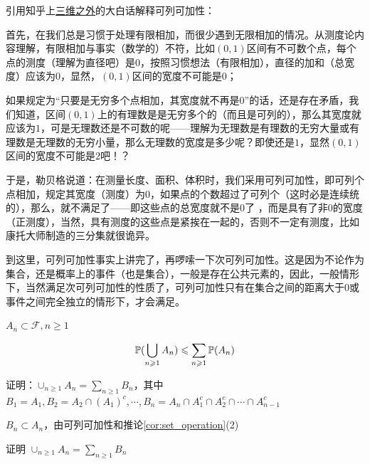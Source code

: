 \begin{remark}
    引用知乎上\href{https://www.zhihu.com/question/25836213/answer/1204497999}{三维之外}的大白话解释可列可加性：

    首先，在我们总是习惯于处理有限相加，而很少遇到无限相加的情况。从测度论内容理解，有限相加与事实（数学的）不符，比如$(0,1)$区间有不可数个点，每个点的测度（理解为直径吧）是$0$，按照习惯想法（有限相加），直径的加和（总宽度）应该为$0$，显然，$(0,1)$区间的宽度不可能是$0$；
    
    如果规定为“只要是无穷多个点相加，其宽度就不再是$0$”的话，还是存在矛盾，我们知道，区间$(0,1)$上的有理数是是无穷多个的（而且是可列的），那么其宽度就应该为$1$，可是无理数还是不可数的呢——理解为无理数是有理数的无穷大量或有理数是无理数的无穷小量，那么无理数的宽度是多少呢？即使还是$1$，显然$(0,1)$区间的宽度不可能是$2$吧！？
    
    于是，勒贝格说道：在测量长度、面积、体积时，我们采用可列可加性，即可列个点相加，规定其宽度（测度）为$0$，如果点的个数超过了可列个（这时必是连续统的），那么，就不满足了——即这些点的总宽度就不是$0$了 ，而是具有了非$0$的宽度（正测度），当然，具有测度的这些点是紧挨在一起的，否则不一定有测度，比如康托大师制造的三分集就很诡异。
    
    到这里，可列可加性事实上讲完了，再啰嗦一下次可列可加性。这是因为不论作为集合，还是概率上的事件（也是集合），一般是存在公共元素的，因此，一般情形下，当然满足次可列可加性的性质了，可列可加性只有在集合之间的距离大于$0$或事件之间完全独立的情形下，才会满足。
\end{remark}

\begin{property}[次可列可加性]
    $A_n\subset \mathcal{F}, n\geq 1$

    \[
    \mathbb{P}(\bigcup_{n\geqslant 1}A_n)\leqslant \sum_{n\geqslant 1}\mathbb{P}(A_n)
    \]
\end{property}

证明：$\cup_{n\geq 1}A_n=\sum_{n\geq 1}B_n$，其中 $B_1=A_1, B_2=A_2\cap (A_1)^c,\cdots , B_n=A_n\cap A_1^c\cap A_2^c\cap \cdots \cap A_{n-1}^c$

$B_n\subset A_n$，由可列可加性和推论\ref{cor:set_operation}(2)

\begin{problem}[作业1-2]\label{exer:disjoint_union}
证明 $\cup_{n\geq 1}A_n=\sum_{n\geq 1}B_n$
\end{problem}


